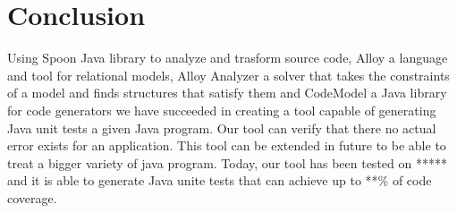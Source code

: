 \chapter*{Conclusion}
\label{ch:Conclusion}
	\thispagestyle{conclusion}
	 Using Spoon Java library to analyze and trasform source code, Alloy a language and tool for relational models, Alloy Analyzer a solver that takes the constraints of a model and finds structures that satisfy them and CodeModel a Java library for code generators we have succeeded in creating a tool capable of generating Java unit tests a given Java program. Our tool can verify that there no actual error exists for an application. This tool can be extended in future to be able to treat a bigger variety of java program. Today, our tool has been tested on ***** and it is able to generate Java unite tests that can achieve up to **\% of code coverage.